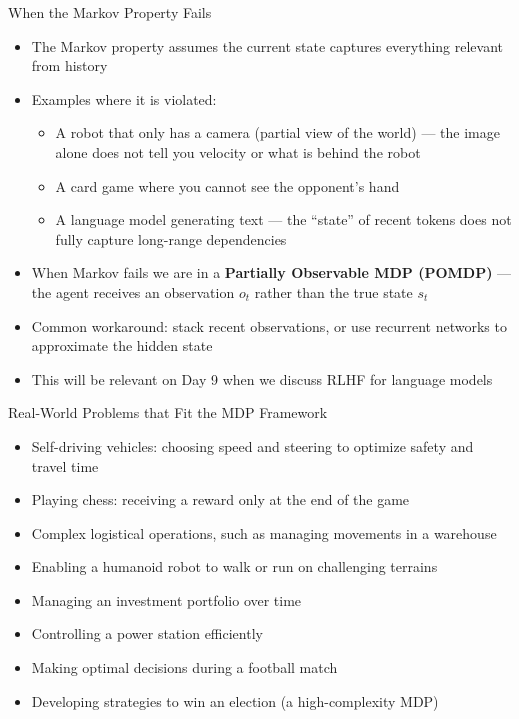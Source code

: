 \begin{frame}{When the Markov Property Fails}
\begin{itemize}
    \item The Markov property assumes the current state captures everything relevant from history
    \item Examples where it is violated:
    \begin{itemize}
        \item A robot that only has a camera (partial view of the world) --- the image alone does not tell you velocity or what is behind the robot
        \item A card game where you cannot see the opponent's hand
        \item A language model generating text --- the ``state'' of recent tokens does not fully capture long-range dependencies
    \end{itemize}
    \item When Markov fails we are in a \textbf{Partially Observable MDP (POMDP)} --- the agent receives an observation $o_t$ rather than the true state $s_t$
    \item Common workaround: stack recent observations, or use recurrent networks to approximate the hidden state
    \item This will be relevant on Day 9 when we discuss RLHF for language models
\end{itemize}
\end{frame}

\begin{frame}{Real-World Problems that Fit the MDP Framework}
    \begin{itemize}
        \item Self-driving vehicles: choosing speed and steering to optimize safety and travel time
        \item Playing chess: receiving a reward only at the end of the game
        \item Complex logistical operations, such as managing movements in a warehouse
        \item Enabling a humanoid robot to walk or run on challenging terrains
        \item Managing an investment portfolio over time
        \item Controlling a power station efficiently
        \item Making optimal decisions during a football match
        \item Developing strategies to win an election (a high-complexity MDP)
    \end{itemize}
\end{frame}

